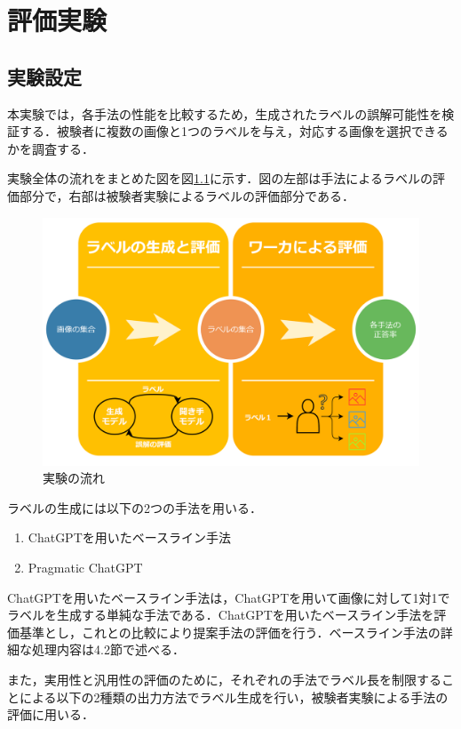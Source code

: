 \documentclass[a4paper,11pt]{jreport}
\begin{document}
\chapter{評価実験}

\section{実験設定}

本実験では，各手法の性能を比較するため，生成されたラベルの誤解可能性を検証する．被験者に複数の画像と1つのラベルを与え，対応する画像を選択できるかを調査する．

実験全体の流れをまとめた図を図\ref{fig:flow_example}に示す．図の左部は手法によるラベルの評価部分で，右部は被験者実験によるラベルの評価部分である．

\begin{figure}[H]
  \centering
  \includegraphics[width=\linewidth]{figures/flow.png}
  \caption{実験の流れ}
  \label{fig:flow_example}
\end{figure}


ラベルの生成には以下の2つの手法を用いる．
\begin{enumerate}
    \item ChatGPTを用いたベースライン手法
    \item Pragmatic ChatGPT
\end{enumerate}

ChatGPTを用いたベースライン手法は，ChatGPTを用いて画像に対して1対1でラベルを生成する単純な手法である．ChatGPTを用いたベースライン手法を評価基準とし，これとの比較により提案手法の評価を行う．ベースライン手法の詳細な処理内容は4.2節で述べる．

また，実用性と汎用性の評価のために，それぞれの手法でラベル長を制限することによる以下の2種類の出力方法でラベル生成を行い，被験者実験による手法の評価に用いる．
\end{document}

